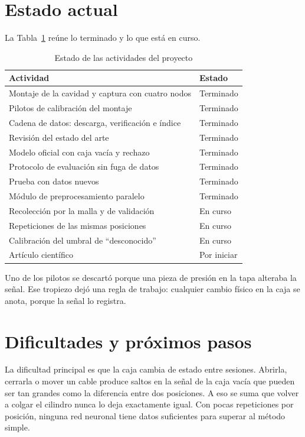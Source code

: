 \documentclass[10pt,journal]{IEEEtran}
\begin{document}
\section{Estado actual}\label{sec:estado}
La Tabla~\ref{tab:estado} reúne lo terminado y lo que está en curso.

\begin{table}[!t]
\renewcommand{\arraystretch}{1.2}
\caption{Estado de las actividades del proyecto}
\label{tab:estado}
\centering
\footnotesize
\begin{tabular}{@{}>{\raggedright\arraybackslash}p{5.6cm}l@{}}
\toprule
Actividad & Estado \\
\midrule
Montaje de la cavidad y captura con cuatro nodos & Terminado \\
Pilotos de calibración del montaje & Terminado \\
Cadena de datos: descarga, verificación e índice & Terminado \\
Revisión del estado del arte & Terminado \\
Modelo oficial con caja vacía y rechazo & Terminado \\
Protocolo de evaluación sin fuga de datos & Terminado \\
Prueba con datos nuevos & Terminado \\
Módulo de preprocesamiento paralelo & Terminado \\
Recolección por la malla y de validación & En curso \\
Repeticiones de las mismas posiciones & En curso \\
Calibración del umbral de ``desconocido'' & En curso \\
Artículo científico & Por iniciar \\
\bottomrule
\end{tabular}
\end{table}

Uno de los pilotos se descartó porque una pieza de presión en la tapa alteraba la señal. Ese tropiezo dejó una regla de trabajo: cualquier cambio físico en la caja se anota, porque la señal lo registra.

\section{Dificultades y próximos pasos}\label{sec:dificultades}
La dificultad principal es que la caja cambia de estado entre sesiones. Abrirla, cerrarla o mover un cable produce saltos en la señal de la caja vacía que pueden ser tan grandes como la diferencia entre dos posiciones. A eso se suma que volver a colgar el cilindro nunca lo deja exactamente igual. Con pocas repeticiones por posición, ninguna red neuronal tiene datos suficientes para superar al método simple.
\end{document}

